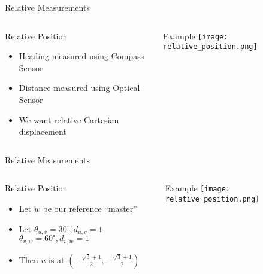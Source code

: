 \documentclass{beamer}
\begin{document}
\begin{frame}{Relative Measurements}
  \begin{columns}[T]
    \begin{column}{.5\textwidth}
     \begin{block}{Relative Position}
        \begin{itemize}
            \item Heading measured using Compass Sensor
            \item Distance measured using Optical Sensor
            \item We want relative Cartesian displacement 
        \end{itemize}
    \end{block}
    \end{column}
    \begin{column}{.5\textwidth}
    \begin{block}{Example}
    \texttt{[image: relative\_position.png]}
    \end{block}
    \end{column}
  \end{columns}
\end{frame}

\begin{frame}{Relative Measurements}
  \begin{columns}[T]
    \begin{column}{.5\textwidth}
     \begin{block}{Relative Position}
        \begin{itemize}
            \item Let $w$ be our reference ``master''
            \item Let $\theta_{u,v} = 30^{\circ}, d_{u,v} = 1$ $\theta_{v,w} =
            60^{\circ}, d_{v,w} = 1$
            \item Then $u$ is at $\left(-\frac{\sqrt{3}+1}{2},
            -\frac{\sqrt{3}+1}{2}\right)$
        \end{itemize}
    \end{block}
    \end{column}
    \begin{column}{.5\textwidth}
    \begin{block}{Example}
    \texttt{[image: relative\_position.png]}
    \end{block}
    \end{column}
  \end{columns}
\end{frame}
\end{document}
